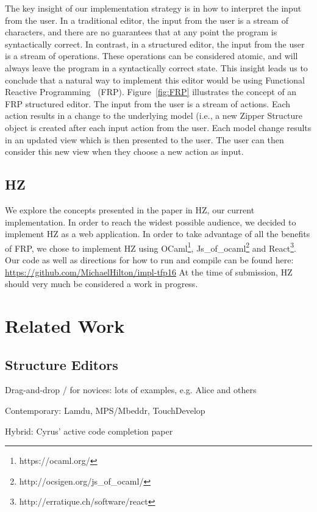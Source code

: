 \documentclass{llncs}
\begin{document}
The key insight of our implementation strategy is in how to interpret the input from the user.
In a traditional editor, the input from the user is a stream of characters, and there are no guarantees that at any point the program is syntactically correct.
In contrast, in a structured editor, the input from the user is a stream of operations.  These operations can be considered atomic, and will always leave the program in a syntactically correct state.
This insight leads us to conclude that a natural way to implement this editor would be using Functional Reactive Programming~\cite{Wan:2000:FRP:349299.349331} (FRP).
Figure~\ref{fig:FRP} illustrates the concept of an FRP structured editor.
The input from the user is a stream of actions.  Each action results in a change to the underlying model (i.e., a new Zipper Structure object is created after each input action from the user.
Each model change results in an updated view which is then presented to the user.  The user can then consider this new view when they choose a new action as input.

\subsection{HZ}
We explore the concepts presented in the paper in HZ, our current implementation.
In order to reach the widest possible audience, we decided to implement HZ as a web application.
In order to take advantage of all the benefits of FRP, we chose to implement HZ using OCaml\footnote{https://ocaml.org/}, Js\_of\_ocaml\footnote{http://ocsigen.org/js\_of\_ocaml/} and React\footnote{http://erratique.ch/software/react}.
Our code as well as directions for how to run and compile can be found here: \url{https://github.com/MichaelHilton/impl-tfp16}
At the time of submission, HZ should very much be considered a work in progress.

\section{Related Work}
\subsection{Structure Editors}
Drag-and-drop / for novices: lots of examples, e.g. Alice and others

Contemporary: Lamdu, MPS/Mbeddr, TouchDevelop

Hybrid: Cyrus' active code completion paper

\end{document}
